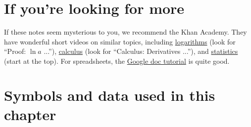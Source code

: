\begin{enumerate}
\begin{comment}
\item (optional) A two-period consumption problem illustrates both
how to maximize a function and how consumers might decide how much to consume now
and how much to save for future spending.
Let us say that a consumer must choose how much to consume in period 1
(say, $c_1$)
and how much to consume in period 2 ($c_2$).
Preferences are represented by a utility function such as
\[
    u(c_1,c_2) \;=\; \ln c_1 + \beta \ln c_2 ,
\]
where log is a convenient function (note that it has diminishing marginal utility)
and $\beta< 1$ discounts period-2 utility relative to period-1.
The consumer maximizes this function subject to the budget constraint,
\[
    c_1 + c_2/(1+r) \;=\;  y_1 + y_2/(1+r) \;=\; V,
\]
where $r$ is the interest rate.
In words:  the present value of consumption equals the present value of income.
We denote the latter by $V$ to save ourselves some typing later on.
How much does the agent consume in period 1?

Answer.  Use the budget constraint to substitute for $c_2$ in the utility
function: $c_2 = (1+r) (V - c_1)$ and $ u(c_1,c_2) = \ln c_1 +
\beta \ln [(1+r)(V-c_1)] $. If we differentiate utility with
respect to $c_1$, we find
\[
    1/c_1 \;=\; \beta/(V-c_1)
\]
or $ c_1 = (1+\beta)^{-1} V$.]
\end{comment}
\end{enumerate}


\section*{If you're looking for more}

If these notes seem mysterious to you,
we recommend the Khan Academy.
They have wonderful short videos on similar topics,
including
\href{http://www.khanacademy.org/#algebra}{logarithms} (look for ``Proof:  $\ln a$ ...''),
\href{http://www.khanacademy.org/#calculus}{calculus} (look for ``Calculus:  Derivatives ...''),
and
\href{http://www.khanacademy.org/#statistics}{statistics} (start at the top).
For spreadsheets, the
\href{https://docs.google.com/support/bin/answer.py?hl=en&answer=140784&topic=20322&rd=1}
{Google doc tutorial}
is quite good.

\section*{Symbols and data used in this chapter}


